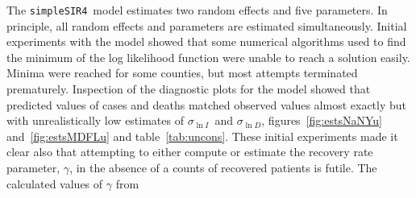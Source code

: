 \documentclass[12pt,letterpaper]{article}
\newcommand\SSm{{\tt simpleSIR4}}
\newcommand\slI{$\sigma_{\ln I}$\ }
\newcommand\slD{$\sigma_{\ln D}$}
\begin{document}
The \SSm\  model estimates two random effects and five parameters.
In principle, all random effects and parameters are estimated
simultaneously.
Initial experiments with the model showed that some
numerical algorithms used to find the minimum of the log likelihood
function were unable to reach a solution easily. Minima were reached
for some counties, but most attempts terminated prematurely. 
Inspection of the diagnostic plots for the model showed that predicted
values of cases and deaths matched observed values almost exactly
but with unrealistically low estimates of \slI and \slD, 
figures~\ref{fig:estsNaNYu} and~\ref{fig:estsMDFLu} and table~\ref{tab:uncons}.
These initial experiments made it clear also
that attempting to either compute or estimate
the recovery rate parameter, $\gamma$, in the absence of a counts of
recovered patients is futile. The calculated values of $\gamma$ from
\end{document}
